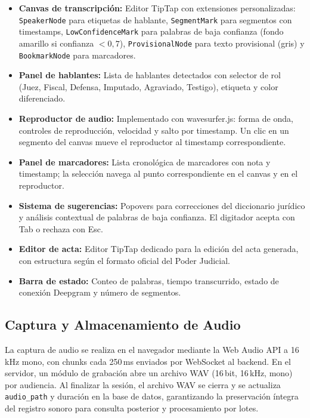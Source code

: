 \documentclass[12pt,a4paper,oneside]{report}
\begin{document}
\begin{itemize}
\item \textbf{Canvas de transcripción:} Editor TipTap con extensiones personalizadas: \texttt{SpeakerNode} para etiquetas de hablante, \texttt{SegmentMark} para segmentos con timestamps, \texttt{LowConfidenceMark} para palabras de baja confianza (fondo amarillo si confianza $< 0{,}7$), \texttt{ProvisionalNode} para texto provisional (gris) y \texttt{BookmarkNode} para marcadores.
\item \textbf{Panel de hablantes:} Lista de hablantes detectados con selector de rol (Juez, Fiscal, Defensa, Imputado, Agraviado, Testigo), etiqueta y color diferenciado.
\item \textbf{Reproductor de audio:} Implementado con wavesurfer.js: forma de onda, controles de reproducción, velocidad y salto por timestamp. Un clic en un segmento del canvas mueve el reproductor al timestamp correspondiente.
\item \textbf{Panel de marcadores:} Lista cronológica de marcadores con nota y timestamp; la selección navega al punto correspondiente en el canvas y en el reproductor.
\item \textbf{Sistema de sugerencias:} Popovers para correcciones del diccionario jurídico y análisis contextual de palabras de baja confianza. El digitador acepta con Tab o rechaza con Esc.
\item \textbf{Editor de acta:} Editor TipTap dedicado para la edición del acta generada, con estructura según el formato oficial del Poder Judicial.
\item \textbf{Barra de estado:} Conteo de palabras, tiempo transcurrido, estado de conexión Deepgram y número de segmentos.
\end{itemize}

\subsection{Captura y Almacenamiento de Audio}

La captura de audio se realiza en el navegador mediante la Web Audio API a 16\,kHz mono, con chunks cada 250\,ms enviados por WebSocket al backend. En el servidor, un módulo de grabación abre un archivo WAV (16\,bit, 16\,kHz, mono) por audiencia. Al finalizar la sesión, el archivo WAV se cierra y se actualiza \texttt{audio\_path} y duración en la base de datos, garantizando la preservación íntegra del registro sonoro para consulta posterior y procesamiento por lotes.
\end{document}
